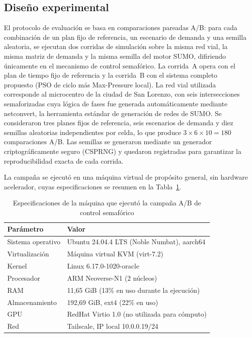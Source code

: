 \subsection{Diseño experimental}
\label{subsec:control_diseno}

El protocolo de evaluación se basa en comparaciones pareadas A/B: para cada combinación
de un plan fijo de referencia, un escenario de demanda y una semilla aleatoria, se
ejecutan dos corridas de simulación sobre la misma red vial, la misma matriz de demanda
y la misma semilla del motor SUMO, difiriendo únicamente en el mecanismo de control
semafórico. La corrida~A opera con el plan de tiempo fijo de referencia y la corrida~B
con el sistema completo propuesto (PSO de ciclo más Max-Pressure local). La red vial
utilizada corresponde al microcentro de la ciudad de San Lorenzo, con seis intersecciones
semaforizadas cuya lógica de fases fue generada automáticamente mediante netconvert, la
herramienta estándar de generación de redes de SUMO. Se consideraron tres planes fijos de referencia,
seis escenarios de demanda y diez semillas aleatorias independientes por celda, lo que
produce $3 \times 6 \times 10 = 180$ comparaciones A/B. Las semillas se generaron
mediante un generador criptográficamente seguro (CSPRNG) y quedaron registradas para
garantizar la reproducibilidad exacta de cada corrida.

La campaña se ejecutó en una máquina virtual de propósito general, sin hardware
acelerador, cuyas especificaciones se resumen en la Tabla~\ref{tab:entorno_ab}.

\begin{table}[htbp]
\renewcommand{\arraystretch}{1.3}
\caption{Especificaciones de la máquina que ejecutó la campaña A/B de control semafórico}
\label{tab:entorno_ab}
\centering
\footnotesize
\begin{tabular}{ll}
\hline
\textbf{Parámetro} & \textbf{Valor} \\
\hline
Sistema operativo      & Ubuntu 24.04.4 LTS (Noble Numbat), aarch64 \\
Virtualización         & Máquina virtual KVM (virt-7.2) \\
Kernel                 & Linux 6.17.0-1020-oracle \\
Procesador             & ARM Neoverse-N1 (2 núcleos) \\
RAM                    & 11,65 GiB (13\% en uso durante la ejecución) \\
Almacenamiento         & 192,69 GiB, ext4 (22\% en uso) \\
GPU                    & RedHat Virtio 1.0 (no utilizada para cómputo) \\
Red                    & Tailscale, IP local 10.0.0.19/24 \\
\hline
\end{tabular}
\end{table}

